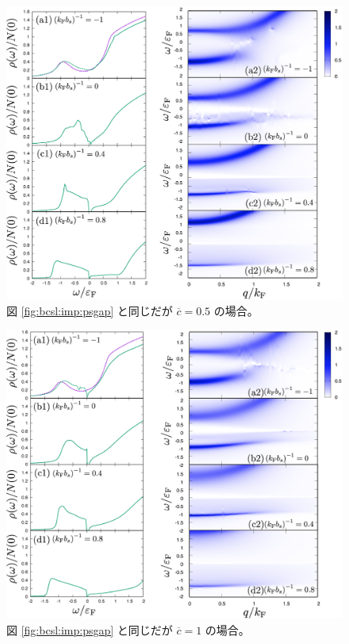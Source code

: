 \begin{figure}[t]
\centering
\includegraphics[width=130mm]{eps/tma-c0500-spe.eps}
\caption{図 \ref{fig:bcsl:imp:psgap} と同じだが $\overline{c}=0.5$ の場合。}
\label{fig:bcsl:imp:psgap1}
\end{figure}

\begin{figure}[t]
\centering
\includegraphics[width=130mm]{eps/tma-c1000-spe.eps}
\caption{図 \ref{fig:bcsl:imp:psgap} と同じだが $\overline{c}=1$ の場合。}
\label{fig:bcsl:imp:psgap2}
\end{figure}


